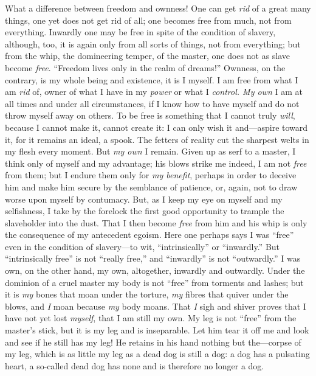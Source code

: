 What a difference between freedom and ownness! One can get \textit{rid} of a 
great many things, one yet does not get rid of all; one becomes free from 
much, not from everything. Inwardly one may be free in spite of the condition 
of slavery, although, too, it is again only from all sorts of things, not from 
everything; but from the whip, the domineering temper, of the master, one does 
not as slave become \textit{free}. ``Freedom lives only in the realm of 
dreams!'' Ownness, on the contrary, is my whole being and existence, it is I 
myself. I am free from what I am \textit{rid} of, owner of what I have in my 
\textit{power} or what I \textit{control. My own} I am at all times and under 
all circumstances, if I know how to have myself and do not throw myself away 
on others. To be free is something that I cannot truly \textit{will}, because 
I cannot make it, cannot create it: I can only wish it and---aspire toward 
it, for it remains an ideal, a spook. The fetters of reality cut the sharpest 
welts in my flesh every moment. But \textit{my own} I remain. Given up as serf 
to a master, I think only of myself and my advantage; his blows strike me 
indeed, I am not \textit{free} from them; but I endure them only for 
\textit{my benefit}, perhaps in order to deceive him and make him secure by 
the semblance of patience, or, again, not to draw worse upon myself by 
contumacy. But, as I keep my eye on myself and my selfishness, I take by the 
forelock the first good opportunity to trample the slaveholder into the dust. 
That I then become \textit{free} from him and his whip is only the consequence 
of my antecedent egoism. Here one perhaps says I was ``free'' even in the 
condition of slavery---to wit, ``intrinsically'' or ``inwardly.'' But 
``intrinsically free'' is not ``really free,'' and ``inwardly'' is not 
``outwardly.'' I was own, on the other hand, my own, altogether, inwardly 
and outwardly. Under the dominion of a cruel master my body is not ``free'' 
from torments and lashes; but it is \textit{my} bones that moan under the 
torture, \textit{my} fibres that quiver under the blows, and \textit{I} moan 
because \textit{my} body moans. That \textit{I} sigh and shiver proves that I 
have not yet lost \textit{myself}, that I am still my own. My leg is not 
``free'' from the master's stick, but it is my leg and is inseparable. Let 
him tear it off me and look and see if he still has my leg! He retains in his 
hand nothing but the---corpse of my leg, which is as little my leg as a dead 
dog is still a dog: a dog has a pulsating heart, a so-called dead dog has none 
and is therefore no longer a dog.

